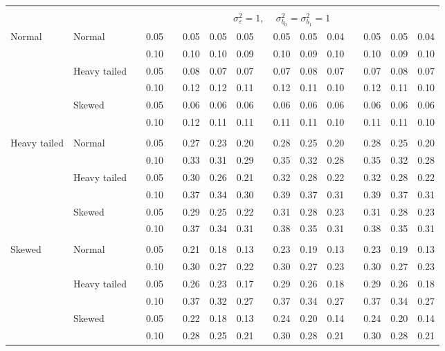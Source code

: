 \documentclass[12pt]{article} %
\begin{document}
\begin{table}[ht]
\begin{scriptsize}
\begin{center}
\begin{tabular}{ll p{.1cm} c p{.1cm} rrr p{.1cm} rrr p{.1cm} rrr}
&&&&&&&&&&&&&&&\\
& && && \multicolumn{9}{c}{$\sigma_{\varepsilon}^2 = 1$, \ \ $\sigma_{b_0}^2 = \sigma_{b_1}^2 = 1$} \\ \cline{6-16}
\rowcolor{gray!20}Normal       & Normal       && 0.05 &&   0.05 & 0.05 & 0.05 && 0.05 & 0.05 & 0.04 && 0.05 & 0.05 & 0.04 \\ 
\rowcolor{gray!20}             &              && 0.10 &&   0.10 & 0.10 & 0.09 && 0.10 & 0.09 & 0.10 && 0.10 & 0.09 & 0.10 \\ 
\rowcolor{gray!20}             & Heavy tailed && 0.05 &&   0.08 & 0.07 & 0.07 && 0.07 & 0.08 & 0.07 && 0.07 & 0.08 & 0.07 \\ 
\rowcolor{gray!20}             &              && 0.10 &&   0.12 & 0.12 & 0.11 && 0.12 & 0.11 & 0.10 && 0.12 & 0.11 & 0.10 \\ 
\rowcolor{gray!20}             & Skewed       && 0.05 &&   0.06 & 0.06 & 0.06 && 0.06 & 0.06 & 0.06 && 0.06 & 0.06 & 0.06 \\ 
\rowcolor{gray!20}             &              && 0.10 &&   0.12 & 0.11 & 0.11 && 0.11 & 0.11 & 0.10 && 0.11 & 0.11 & 0.10 \\ 
             &&&&&&&&&&&&&&&\\
Heavy tailed & Normal       && 0.05 &&   0.27 & 0.23 & 0.20 && 0.28 & 0.25 & 0.20 && 0.28 & 0.25 & 0.20 \\ 
             &              && 0.10 &&   0.33 & 0.31 & 0.29 && 0.35 & 0.32 & 0.28 && 0.35 & 0.32 & 0.28 \\ 
             & Heavy tailed && 0.05 &&   0.30 & 0.26 & 0.21 && 0.32 & 0.28 & 0.22 && 0.32 & 0.28 & 0.22 \\ 
             &              && 0.10 &&   0.37 & 0.34 & 0.30 && 0.39 & 0.37 & 0.31 && 0.39 & 0.37 & 0.31 \\ 
             & Skewed       && 0.05 &&   0.29 & 0.25 & 0.22 && 0.31 & 0.28 & 0.23 && 0.31 & 0.28 & 0.23 \\ 
             &              && 0.10 &&   0.37 & 0.34 & 0.31 && 0.38 & 0.35 & 0.31 && 0.38 & 0.35 & 0.31 \\ 
             &&&&&&&&&&&&&&&\\
Skewed       & Normal       && 0.05 &&   0.21 & 0.18 & 0.13 && 0.23 & 0.19 & 0.13 && 0.23 & 0.19 & 0.13 \\ 
             &              && 0.10 &&   0.30 & 0.27 & 0.22 && 0.30 & 0.27 & 0.23 && 0.30 & 0.27 & 0.23 \\ 
             & Heavy tailed && 0.05 &&   0.26 & 0.23 & 0.17 && 0.29 & 0.26 & 0.18 && 0.29 & 0.26 & 0.18 \\ 
             &              && 0.10 &&   0.37 & 0.32 & 0.27 && 0.37 & 0.34 & 0.27 && 0.37 & 0.34 & 0.27 \\ 
             & Skewed       && 0.05 &&   0.22 & 0.18 & 0.13 && 0.24 & 0.20 & 0.14 && 0.24 & 0.20 & 0.14 \\ 
             &              && 0.10 &&   0.28 & 0.25 & 0.21 && 0.30 & 0.28 & 0.21 && 0.30 & 0.28 & 0.21 \\ 



\end{tabular}
\end{center}
\end{scriptsize}
\end{table}
\end{document}

